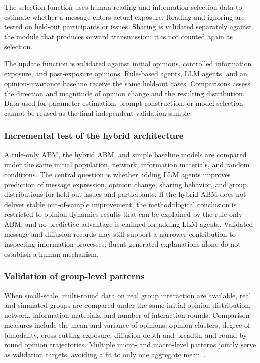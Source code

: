 \documentclass[11pt,a4paper]{article}
\begin{document}
The selection function uses human reading and information-selection data to estimate whether a message enters actual exposure. Reading and ignoring are tested on held-out participants or issues. Sharing is validated separately against the module that produces onward transmission; it is not counted again as selection.

The update function is validated against initial opinions, controlled information exposure, and post-exposure opinions. Rule-based agents, LLM agents, and an opinion-invariance baseline receive the same held-out cases. Comparisons assess the direction and magnitude of opinion change and the resulting distribution. Data used for parameter estimation, prompt construction, or model selection cannot be reused as the final independent validation sample.

\subsubsection{Incremental test of the hybrid architecture}

A rule-only ABM, the hybrid ABM, and simple baseline models are compared under the same initial population, network, information materials, and random conditions. The central question is whether adding LLM agents improves prediction of message expression, opinion change, sharing behavior, and group distributions for held-out issues and participants. If the hybrid ABM does not deliver stable out-of-sample improvement, the methodological conclusion is restricted to opinion-dynamics results that can be explained by the rule-only ABM, and no predictive advantage is claimed for adding LLM agents. Validated message and diffusion records may still support a narrower contribution to inspecting information processes; fluent generated explanations alone do not establish a human mechanism.

\subsubsection{Validation of group-level patterns}

When small-scale, multi-round data on real group interaction are available, real and simulated groups are compared under the same initial opinion distribution, network, information materials, and number of interaction rounds. Comparison measures include the mean and variance of opinions, opinion clusters, degree of bimodality, cross-cutting exposure, diffusion depth and breadth, and round-by-round opinion trajectories. Multiple micro- and macro-level patterns jointly serve as validation targets, avoiding a fit to only one aggregate mean~\citep{grimm2005}.
\end{document}
